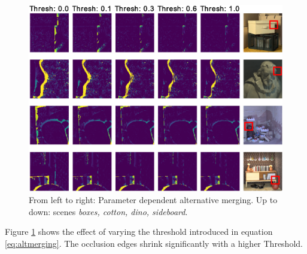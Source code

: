 \documentclass  [
  paper    = a4,
  BCOR     = 10mm,
  twoside,
  fontsize = 12pt,
  fleqn,
  toc      = bibnumbered,
  toc      = listofnumbered,
  numbers  = noendperiod,
  headings = normal,
  listof   = leveldown,
  version  = 3.03
]                                       {scrreprt}
\begin{document}
\begin{figure}
	\centering
	\includegraphics[width=1\linewidth]{images/choose_lower_difference}
	\caption[Alternative Merging:Parameter dependence]{From left to right: Parameter dependent alternative merging. Up to down: scenes \textit{boxes, cotton, dino, sideboard}.}
	\label{fig:chooselowerdifference-eps-converted-to}
\end{figure}

 Figure \ref{fig:chooselowerdifference-eps-converted-to} shows the effect of varying the threshold introduced in equation \ref{eq:altmerging}. The occlusion edges shrink significantly with a higher Threshold.
\end{document}
